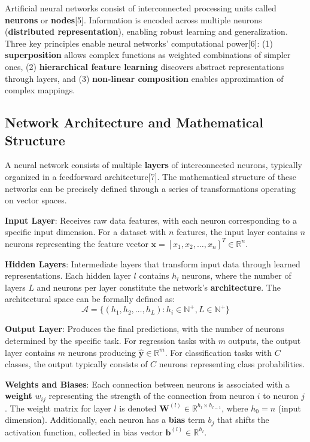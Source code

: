 \documentclass[11pt,a4paper]{report}
\begin{document}
Artificial neural networks consist of interconnected processing units called \textbf{neurons} or \textbf{nodes}[5]. Information is encoded across multiple neurons (\textbf{distributed representation}), enabling robust learning and generalization. Three key principles enable neural networks' computational power[6]: (1) \textbf{superposition} allows complex functions as weighted combinations of simpler ones, (2) \textbf{hierarchical feature learning} discovers abstract representations through layers, and (3) \textbf{non-linear composition} enables approximation of complex mappings.

\subsection{Network Architecture and Mathematical Structure}

A neural network consists of multiple \textbf{layers} of interconnected neurons, typically organized in a feedforward architecture[7]. The mathematical structure of these networks can be precisely defined through a series of transformations operating on vector spaces.

\textbf{Input Layer}: Receives raw data features, with each neuron corresponding to a specific input dimension. For a dataset with $n$ features, the input layer contains $n$ neurons representing the feature vector $\mathbf{x} = [x_1, x_2, \ldots, x_n]^T \in \mathbb{R}^n$.

\textbf{Hidden Layers}: Intermediate layers that transform input data through learned representations. Each hidden layer $l$ contains $h_l$ neurons, where the number of layers $L$ and neurons per layer constitute the network's \textbf{architecture}. The architectural space can be formally defined as:
\begin{equation}
\mathcal{A} = \{(h_1, h_2, \ldots, h_L) : h_i \in \mathbb{N}^+, L \in \mathbb{N}^+\}
\end{equation}

\textbf{Output Layer}: Produces the final predictions, with the number of neurons determined by the specific task. For regression tasks with $m$ outputs, the output layer contains $m$ neurons producing $\hat{\mathbf{y}} \in \mathbb{R}^m$. For classification tasks with $C$ classes, the output typically consists of $C$ neurons representing class probabilities.

\textbf{Weights and Biases}: Each connection between neurons is associated with a \textbf{weight} $w_{ij}$ representing the strength of the connection from neuron $i$ to neuron $j$. The weight matrix for layer $l$ is denoted $\mathbf{W}^{(l)} \in \mathbb{R}^{h_l \times h_{l-1}}$, where $h_0 = n$ (input dimension). Additionally, each neuron has a \textbf{bias} term $b_j$ that shifts the activation function, collected in bias vector $\mathbf{b}^{(l)} \in \mathbb{R}^{h_l}$.
\end{document}
